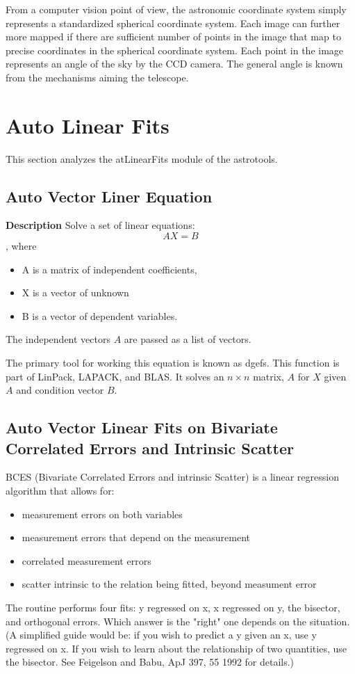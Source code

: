 From a computer vision point of view, the astronomic coordinate system simply represents a standardized spherical coordinate system.  Each image can further more mapped if there are sufficient number of points in the image that map to precise coordinates in the spherical coordinate system.  Each point in the image represents an angle of the sky by the CCD camera.  The general angle is known from the mechanisms aiming the telescope.  

\section {Auto Linear Fits}
This section analyzes the atLinearFits module of the astrotools.  


\subsection{Auto Vector Liner Equation}

\textbf{Description} Solve a set of linear equations: 
\[ A X = B \]
, where \begin{itemize}
\item A is a matrix of independent coefficients, 
\item X is a vector of unknown
\item B is a vector of dependent variables. 
\end{itemize}
The independent vectors $A$ are passed as a list of vectors.

The primary tool for working this equation is known as dgefs.   This function is part of LinPack, LAPACK, and BLAS.  It solves an $n\times n$ matrix, $A$ for $X$ given $A$ and condition vector $B$.   

\subsection {Auto Vector Linear Fits on Bivariate Correlated Errors and Intrinsic Scatter}
BCES (Bivariate Correlated Errors and intrinsic Scatter) is a linear
  regression algorithm that allows for:
\begin{itemize}
\item measurement errors on both variables
\item measurement errors that depend on the measurement
\item correlated measurement errors
\item scatter intrinsic to the relation being fitted, beyond measument error
\end {itemize}
  The routine performs four fits: y regressed on x, x regressed on y, the bisector, and orthogonal errors. Which answer is the "right" one depends on the situation. (A simplified guide would be: if you wish to predict a y given an x, use y regressed on x. If you wish to learn about the relationship of two quantities, use the bisector. See Feigelson and Babu, ApJ 397, 55 1992 for details.)

